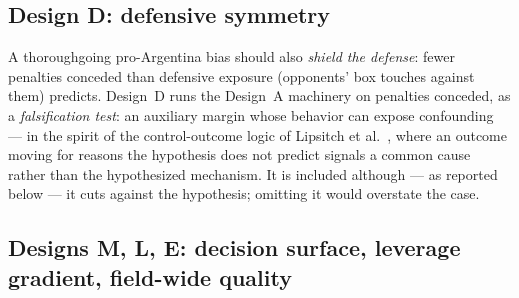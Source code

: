 \documentclass[11pt,a4paper]{article}
\begin{document}
\subsection{Design D: defensive symmetry}

A thoroughgoing pro-Argentina bias should also \emph{shield the defense}: fewer
penalties conceded than defensive exposure (opponents' box touches against them)
predicts. Design~D runs the Design~A machinery on penalties conceded, as a
\emph{falsification test}: an auxiliary margin whose behavior can expose confounding
--- in the spirit of the control-outcome logic of Lipsitch et al.\
\cite{lipsitch2010}, where an outcome moving for reasons the hypothesis does not
predict signals a common cause rather than the hypothesized mechanism. It is included
although --- as reported below --- it cuts against the hypothesis; omitting it would
overstate the case.

\subsection{Designs M, L, E: decision surface, leverage gradient, field-wide quality}
\label{sec:mle-method}
\end{document}
